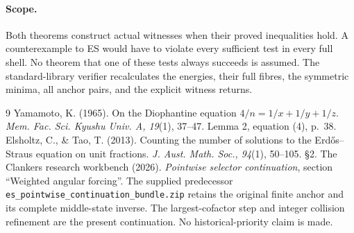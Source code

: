 \documentclass[11pt]{amsart}
\begin{document}
\paragraph{Scope.}
Both theorems construct actual witnesses when their proved inequalities hold.
A counterexample to ES would have to violate every sufficient test in every
full shell. No theorem that one of these tests always succeeds is assumed.
The standard-library verifier recalculates the energies, their full fibres,
the symmetric minima, all anchor pairs, and the explicit witness returns.

\begin{thebibliography}{9}
 Yamamoto, K. (1965). On the Diophantine equation
$4/n=1/x+1/y+1/z$. \emph{Mem. Fac. Sci. Kyushu Univ. A, 19}(1), 37--47.
Lemma 2, equation (4), p.~38.
 Elsholtz, C., \& Tao, T. (2013). Counting the number of solutions
to the Erd\H{o}s--Straus equation on unit fractions. \emph{J. Aust. Math.
Soc., 94}(1), 50--105. \S2.
 The Clankers research workbench (2026).
\emph{Pointwise selector continuation}, section ``Weighted angular forcing''.
The supplied predecessor \texttt{es\_pointwise\_continuation\_bundle.zip}
retains the original finite anchor and its complete middle-state inverse.
The largest-cofactor step and integer collision refinement are the
present continuation. No historical-priority claim is made.
\end{thebibliography}
\end{document}
